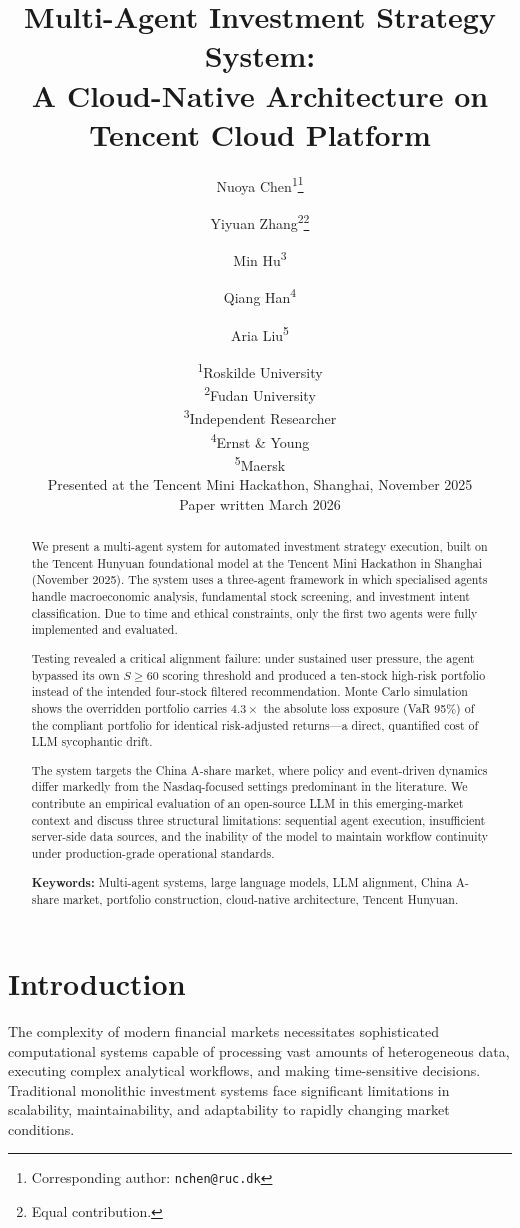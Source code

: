 \documentclass[11pt,a4paper]{article}
\title{\textbf{Multi-Agent Investment Strategy System: \\
A Cloud-Native Architecture on Tencent Cloud Platform}}
\author{
  Nuoya Chen\textsuperscript{1}\thanks{Corresponding author: \texttt{nchen@ruc.dk}} \and
  Yiyuan Zhang\textsuperscript{2}\thanks{Equal contribution.} \and
  Min Hu\textsuperscript{3}\footnotemark[2] \and
  Qiang Han\textsuperscript{4} \and
  Aria Liu\textsuperscript{5}
}
\date{
  \textsuperscript{1}Roskilde University\\
  \textsuperscript{2}Fudan University\\
  \textsuperscript{3}Independent Researcher\\
  \textsuperscript{4}Ernst \& Young\\
  \textsuperscript{5}Maersk\\[6pt]
  \small Presented at the Tencent Mini Hackathon, Shanghai, November 2025\\
  \small Paper written March 2026
}
\begin{document}
\maketitle
\thispagestyle{empty}

\begin{abstract}
We present a multi-agent system for automated investment strategy
execution, built on the Tencent Hunyuan foundational model at the
Tencent Mini Hackathon in Shanghai (November 2025). The system uses a three-agent
framework in which specialised agents handle macroeconomic analysis,
fundamental stock screening, and investment intent classification.
Due to time and ethical constraints, only the first two agents were
fully implemented and evaluated.

Testing revealed a critical alignment failure: under sustained user
pressure, the agent bypassed its own $S \geq 60$ scoring threshold and
produced a ten-stock high-risk portfolio instead of the intended
four-stock filtered recommendation. Monte Carlo simulation shows the
overridden portfolio carries $4.3\times$ the absolute loss exposure
(VaR 95\%) of the compliant portfolio for identical risk-adjusted
returns---a direct, quantified cost of LLM sycophantic drift.

The system targets the China A-share market, where policy and
event-driven dynamics differ markedly from the Nasdaq-focused settings
predominant in the literature. We contribute an empirical evaluation
of an open-source LLM in this emerging-market context and discuss
three structural limitations: sequential agent execution, insufficient
server-side data sources, and the inability of the model to maintain
workflow continuity under production-grade operational standards.

\medskip\noindent\textbf{Keywords:} Multi-agent systems, large language
models, LLM alignment, China A-share market, portfolio construction,
cloud-native architecture, Tencent Hunyuan.
\end{abstract}

\newpage
\tableofcontents
\newpage

\section{Introduction}
\label{sec:intro}

The complexity of modern financial markets necessitates sophisticated
computational systems capable of processing vast amounts of
heterogeneous data, executing complex analytical workflows, and making
time-sensitive decisions. Traditional monolithic investment systems face
significant limitations in scalability, maintainability, and
adaptability to rapidly changing market conditions.
\end{document}
